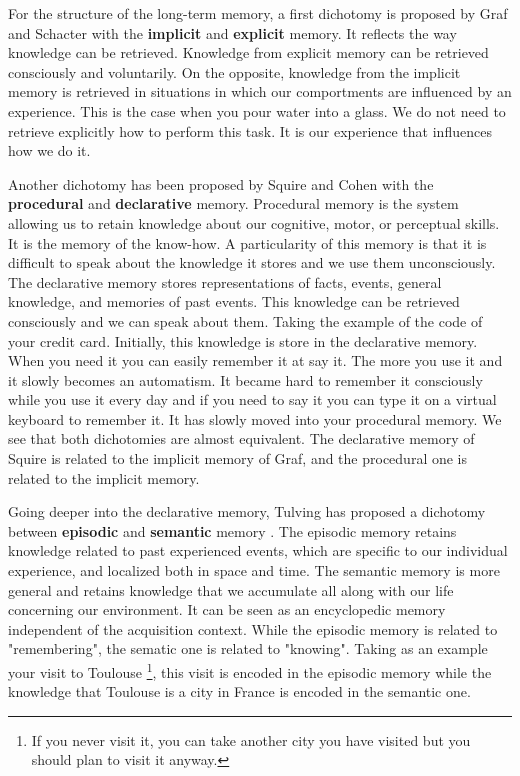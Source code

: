 For the structure of the long-term memory, a first dichotomy is proposed by Graf and Schacter \cite{graf_1985_implicit} with the \textbf{implicit} and \textbf{explicit} memory. It reflects the way knowledge can be retrieved. Knowledge from explicit memory can be retrieved consciously and voluntarily. On the opposite, knowledge from the implicit memory is retrieved in situations in which our comportments are influenced by an experience. This is the case when you pour water into a glass. We do not need to retrieve explicitly how to perform this task. It is our experience that influences how we do it.

Another dichotomy has been proposed by Squire and Cohen \cite{squire_1982_remote} with the \textbf{procedural} and \textbf{declarative} memory. Procedural memory is the system allowing us to retain knowledge about our cognitive, motor, or perceptual skills. It is the memory of the know-how. A particularity of this memory is that it is difficult to speak about the knowledge it stores and we use them unconsciously. The declarative memory stores representations of facts, events, general knowledge, and memories of past events. This knowledge can be retrieved consciously and we can speak about them. Taking the example of the code of your credit card. Initially, this knowledge is store in the declarative memory. When you need it you can easily remember it at say it. The more you use it and it slowly becomes an automatism. It became hard to remember it consciously while you use it every day and if you need to say it you can type it on a virtual keyboard to remember it. It has slowly moved into your procedural memory. We see that both dichotomies are almost equivalent. The declarative memory of Squire is related to the implicit memory of Graf, and the procedural one is related to the implicit memory.

Going deeper into the declarative memory, Tulving has proposed a dichotomy between \textbf{episodic} and \textbf{semantic} memory \cite{tulving_1995_organization}. The episodic memory retains knowledge related to past experienced events, which are specific to our individual experience, and localized both in space and time. The semantic memory is more general and retains knowledge that we accumulate all along with our life concerning our environment. It can be seen as an encyclopedic memory independent of the acquisition context. While the episodic memory is related to "remembering", the sematic one is related to "knowing". Taking as an example your visit to Toulouse \footnote{If you never visit it, you can take another city you have visited but you should plan to visit it anyway.}, this visit is encoded in the episodic memory while the knowledge that Toulouse is a city in France is encoded in the semantic one.

